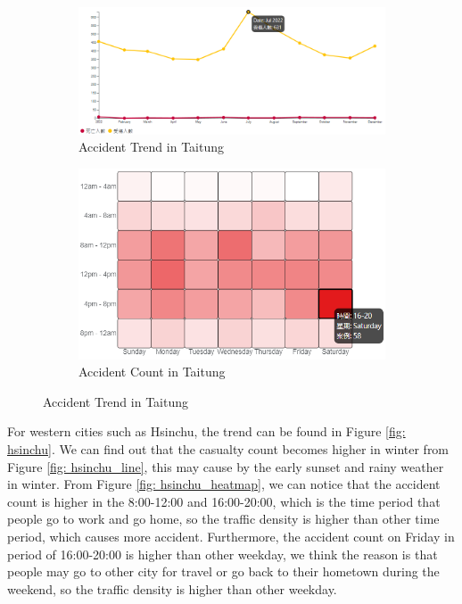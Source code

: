 \documentclass[a4paper, oneside, final, 12pt]{scrartcl} %
\begin{document}
\begin{figure}[htbp]
  \centering
  \begin{subfigure}[b]{0.6\textwidth}
      \includegraphics[width=\textwidth]{"./Image/eastern_line.png"}
      \caption{Accident Trend in Taitung}
      \label{fig: taitung_line}
  \end{subfigure}
  \begin{subfigure}[b]{0.35\textwidth}
      \includegraphics[width=\textwidth]{"./Image/eastern_heatmap.png"}
      \caption{Accident Count in Taitung}
      \label{fig: taitung_heatmap}
  \end{subfigure}
  \caption{Accident Trend in Taitung}
  \label{fig: taitung}
\end{figure}

For western cities such as Hsinchu,
the trend can be found in Figure \ref{fig: hsinchu}.
We can find out that the casualty count becomes 
higher in winter from Figure \ref{fig: hsinchu_line},
this may cause by the early sunset and rainy weather in winter.
From Figure \ref{fig: hsinchu_heatmap}, we can notice that
the accident count is higher in the 8:00-12:00 and 16:00-20:00,
which is the time period that people go to work and go home,
so the traffic density is higher than other time period,
which causes more accident.
Furthermore, the accident count on Friday in period of 16:00-20:00
is higher than other weekday, we think the reason is that
people may go to other city for travel or go back to their hometown
during the weekend, so the traffic density is higher than other weekday.
\end{document}
